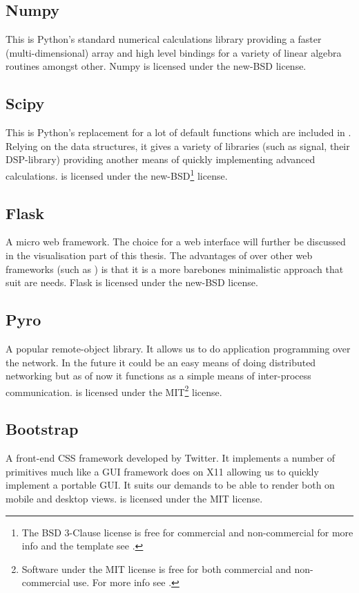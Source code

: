 \documentclass[a4paper, openany, oneside]{memoir}
\begin{document}
\subsection{Numpy}
\label{sec:numpy}
This is Python's standard numerical calculations library providing a faster (multi-dimensional) array and high level bindings for a variety of linear algebra routines amongst other. Numpy is licensed under the new-BSD license.

\subsection{Scipy}
\label{sec:scipy}
This is Python's replacement for a lot of default functions which are included in \matlab{}. Relying on the  data structures, it gives a variety of libraries (such as signal, their DSP-library) providing another means of quickly implementing advanced calculations.  is licensed under the new-BSD\footnote{\label{fn:bsd}The BSD 3-Clause license is free for commercial and non-commercial for more info and the template see \cite{bsdlic}.} license.

\subsection{Flask}
\label{sec:flask}
A micro web framework. The choice for a web interface will further be discussed in the visualisation part of this thesis. The advantages of  over other web frameworks (such as ) is that it is a more barebones minimalistic approach that suit are needs. Flask is licensed under the new-BSD license.

\subsection{Pyro}
\label{sec:pyro}
A popular remote-object library. It allows us to do application programming over the network. In the future it could be an easy means of doing distributed networking but as of now it functions as a simple means of inter-process communication.  is licensed under the MIT\footnote{\label{fn:mit}Software under the MIT license is free for both commercial and non-commercial use. For more info see \cite{mitlic}.} license.

\subsection{Bootstrap}
\label{sec:bootstrap}
A front-end CSS framework developed by Twitter. It implements a number of primitives much like a GUI framework does on X11 allowing us to quickly implement a portable GUI. It suits our demands to be able to render both on mobile and desktop views.  is licensed under the MIT license.
\end{document}

